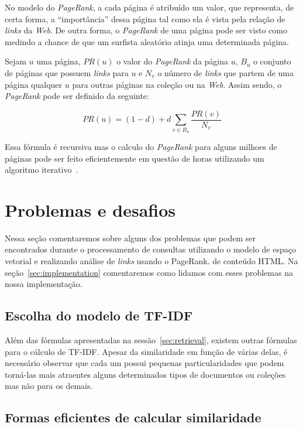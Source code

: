 \documentclass[10pt,twocolumn]{article}
\begin{document}
No modelo do \emph{PageRank}, a cada página é atribuído um valor, que
representa, de certa forma, a ``importância'' dessa página tal como ela
é vista pela relação de \emph{links} da \emph{Web}. De outra forma, o
\emph{PageRank} de uma página pode ser visto como medindo a chance de
que um surfista aleatório atinja uma determinada página.

Sejam \(u\) uma página, \(PR(u)\) o valor do \emph{PageRank} da página
\(u\), \(B_u\) o conjunto de páginas que possuem
\emph{links} para \(u\) e \(N_v\) o número de \emph{links} que
partem de uma página qualquer \(u\) para outras páginas na coleção ou na
\emph{Web}. Assim sendo, o \emph{PageRank} pode ser definido da
seguinte:

\begin{equation}
 PR(u) = (1-d) + d\sum_{v \in B_u}\frac{PR(v)}{N_v}
\label{eq:pagerank}
\end{equation}

Essa fórmula é recursiva mas o calculo do \emph{PageRank} para alguns
milhoes de páginas pode ser feito eficientemente em questão de horas
utilizando um algoritmo iterativo~\cite{brin1998google}.




\section{Problemas e desafios}

Nessa seção comentaremos sobre alguns dos problemas que podem ser
encontrados durante o processamento de consultas utilizando o modelo de
espaço vetorial e realizando análise de \emph{links} usando o PageRank.
de conteúdo HTML. Na
seção~\ref{sec:implementation} comentaremos como lidamos com esses
problemas na nossa implementação.

\subsection{Escolha do modelo de TF-IDF}

Além das fórmulas apresentadas na sessão~\ref{sec:retrieval}, existem
outras fórmulas para o cálculo de TF-IDF. Apesar da similaridade em
função de várias delas, é necessário observar que cada um possui
pequenas particularidades que podem torná-las mais atraentes alguns
determinados tipos de documentos ou coleções mas não para os demais.

\subsection{Formas eficientes de calcular similaridade}
\end{document}
